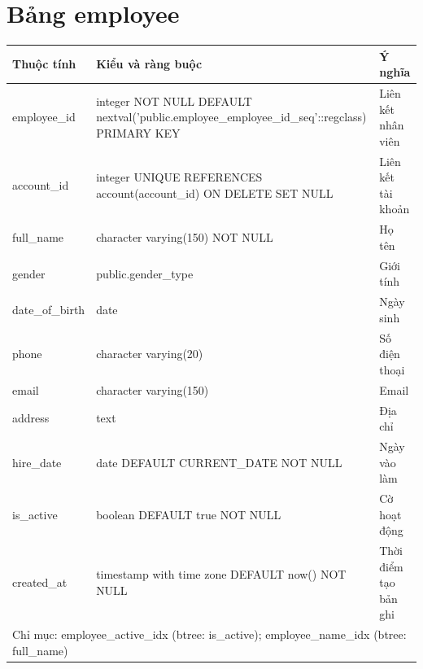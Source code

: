 \section{Bảng employee}
\begin{longtable}{|p{}|p{}|p{}|}\hline
\textbf{Thuộc tính}&\textbf{Kiểu và ràng buộc}&\textbf{Ý nghĩa}\\\hline\endhead
employee\_id & integer NOT NULL DEFAULT nextval('public.employee\_employee\_id\_seq'::regclass) PRIMARY KEY & Liên kết nhân viên\\\hline
account\_id & integer UNIQUE REFERENCES account(account\_id) ON DELETE SET NULL & Liên kết tài khoản\\\hline
full\_name & character varying(150) NOT NULL & Họ tên\\\hline
gender & public.gender\_type & Giới tính\\\hline
date\_of\_birth & date & Ngày sinh\\\hline
phone & character varying(20) & Số điện thoại\\\hline
email & character varying(150) & Email\\\hline
address & text & Địa chỉ\\\hline
hire\_date & date DEFAULT CURRENT\_DATE NOT NULL & Ngày vào làm\\\hline
is\_active & boolean DEFAULT true NOT NULL & Cờ hoạt động\\\hline
created\_at & timestamp with time zone DEFAULT now() NOT NULL & Thời điểm tạo bản ghi\\\hline
\multicolumn{3}{|p{0.93\textwidth}|}{Chỉ mục: employee\_active\_idx (btree: is\_active); employee\_name\_idx (btree: full\_name)}\\\hline
\end{longtable}
\normalsize
